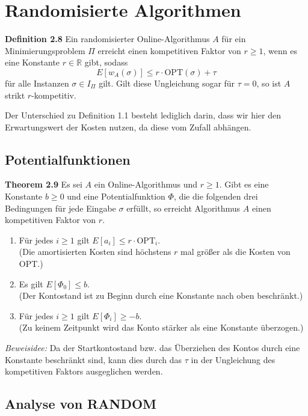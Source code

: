 \documentclass[a4paper]{report}
\begin{document}
\section{Randomisierte Algorithmen}


\textbf{Definition 2.8} Ein randomisierter Online-Algorithmus $A$ für ein Minimierungsproblem $\Pi$ erreicht einen kompetitiven Faktor von $r \ge 1$, wenn es eine Konstante $r \in \mathbb{R}$ gibt, sodass
$$E[w_A(\sigma)] \leq r \cdot \textrm{OPT}(\sigma) + \tau$$
für alle Instanzen $\sigma \in I_\Pi$ gilt. Gilt diese Ungleichung sogar für $\tau = 0$, so ist $A$ strikt $r$-kompetitiv.

Der Unterschied zu Definition 1.1 besteht lediglich darin, dass wir hier den Erwartungswert der Kosten nutzen, da diese vom Zufall abhängen.

\subsection{Potentialfunktionen}

\textbf{Theorem 2.9} Es sei $A$ ein Online-Algorithmus und $r \geq 1$. Gibt es eine Konstante $b \geq 0$ und eine Potentialfunktion $\Phi$, die die folgenden drei Bedingungen für jede Eingabe $\sigma$ erfüllt, so erreicht Algorithmus $A$ einen kompetitiven Faktor von $r$.
\begin{enumerate}
\item Für jedes $i \geq 1$ gilt $E[a_i] \leq r \cdot \textrm{OPT}_i$.\\
(Die amortisierten Kosten sind höchstens $r$ mal größer als die Kosten von OPT.)
\item Es gilt $E[\Phi_0] \leq b$.\\
(Der Kontostand ist zu Beginn durch eine Konstante nach oben beschränkt.)
\item Für jedes $i \geq 1$ gilt $E[\Phi_i] \geq -b$.\\
(Zu keinem Zeitpunkt wird das Konto stärker als eine Konstante überzogen.)
\end{enumerate}

\textit{Beweisidee:} Da der Startkontostand bzw. das Überziehen des Kontos durch eine Konstante beschränkt sind, kann dies durch das $\tau$ in der Ungleichung des kompetitiven Faktors ausgeglichen werden.


\subsection{Analyse von RANDOM}
\end{document}
